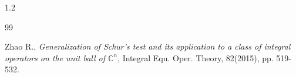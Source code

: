 \documentclass[10pt]{amsart}
\theoremstyle{definition}    %
\numberwithin{equation}{section}
\begin{document}
\begin{spacing}{1.2}
\begin{thebibliography}{99}

Zhao R., {\em Generalization of Schur’s test and its application to a class of integral operators on the unit ball of $\mathbb{C}^n$}, Integral Equ. Oper. Theory, 82(2015), pp. 519-532.






\end{thebibliography}
\end{spacing}
\end{document}
